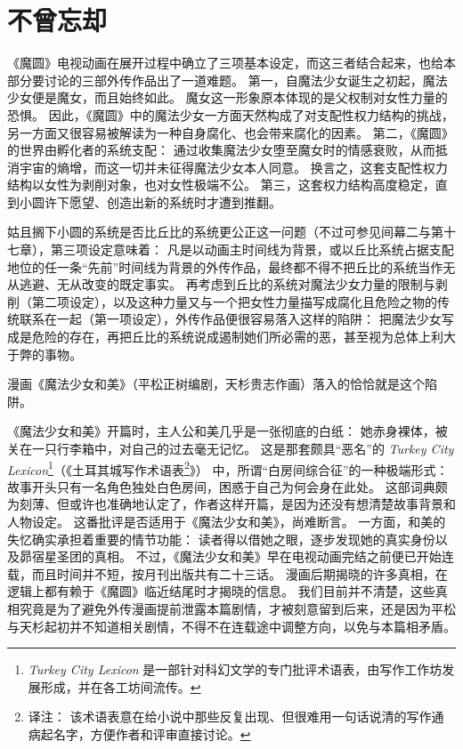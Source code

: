 \chapter[不曾忘却]{不曾忘却}


《魔圆》电视动画在展开过程中确立了三项基本设定，而这三者结合起来，也给本部分要讨论的三部外传作品出了一道难题。
第一，自魔法少女诞生之初起，魔法少女便是魔女，而且始终如此。
魔女这一形象原本体现的是父权制对女性力量的恐惧\cite{ref103}。
因此，《魔圆》中的魔法少女一方面天然构成了对支配性权力结构的挑战，另一方面又很容易被解读为一种自身腐化、也会带来腐化的因素。
第二，《魔圆》的世界由孵化者的系统支配：
通过收集魔法少女堕至魔女时的情感衰败，从而抵消宇宙的熵增，而这一切并未征得魔法少女本人同意。
换言之，这套支配性权力结构以女性为剥削对象，也对女性极端不公。
第三，这套权力结构高度稳定，直到小圆许下愿望、创造出新的系统时才遭到推翻。

姑且搁下小圆的系统是否比丘比的系统更公正这一问题（不过可参见间幕二与第十七章），第三项设定意味着：
凡是以动画主时间线为背景，或以丘比系统占据支配地位的任一条“先前”时间线为背景的外传作品，最终都不得不把丘比的系统当作无从逃避、无从改变的既定事实。
再考虑到丘比的系统对魔法少女力量的限制与剥削（第二项设定），以及这种力量又与一个把女性力量描写成腐化且危险之物的传统联系在一起（第一项设定），外传作品便很容易落入这样的陷阱：
把魔法少女写成是危险的存在，再把丘比的系统说成遏制她们所必需的恶，甚至视为总体上利大于弊的事物。

漫画《魔法少女和美》（平松正树编剧，天杉贵志作画）落入的恰恰就是这个陷阱。

《魔法少女和美》开篇时，主人公和美几乎是一张彻底的白纸：
她赤身裸体，被关在一只行李箱中，对自己的过去毫无记忆。
这是那套颇具“恶名”的 \emph{Turkey City Lexicon}\footnote{%
    \emph{Turkey City Lexicon} 是一部针对科幻文学的专门批评术语表，由写作工作坊发展形成，并在各工坊间流传。
}（《土耳其城写作术语表\footnote{%
    译注：
    该术语表意在给小说中那些反复出现、但很难用一句话说清的写作通病起名字，方便作者和评审直接讨论。
}》）\cite{ref104} 中，所谓“白房间综合征”的一种极端形式：
故事开头只有一名角色独处白色房间，困惑于自己为何会身在此处。
这部词典颇为刻薄、但或许也准确地认定了，作者这样开篇，是因为还没有想清楚故事背景和人物设定。
这番批评是否适用于《魔法少女和美》，尚难断言。
一方面，和美的失忆确实承担着重要的情节功能：
读者得以借她之眼，逐步发现她的真实身份以及昴宿星圣团的真相。
不过，《魔法少女和美》早在电视动画完结之前便已开始连载，而且时间并不短，按月刊出版共有二十三话。
漫画后期揭晓的许多真相，在逻辑上都有赖于《魔圆》临近结尾时才揭晓的信息。
我们目前并不清楚，这些真相究竟是为了避免外传漫画提前泄露本篇剧情，才被刻意留到后来，还是因为平松与天杉起初并不知道相关剧情，不得不在连载途中调整方向，以免与本篇相矛盾。


